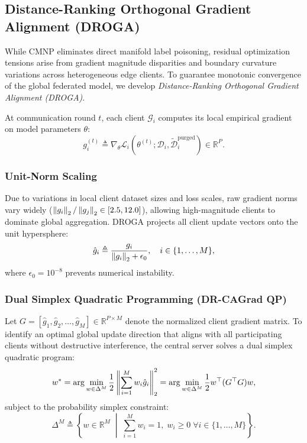 \subsection{Distance-Ranking Orthogonal Gradient Alignment (DROGA)}
\label{subsec:droga}

While CMNP eliminates direct manifold label poisoning, residual optimization tensions arise from gradient magnitude disparities and boundary curvature variations across heterogeneous edge clients. To guarantee monotonic convergence of the global federated model, we develop \emph{Distance-Ranking Orthogonal Gradient Alignment (DROGA)}.

At communication round $t$, each client $\mathcal{G}_i$ computes its local empirical gradient on model parameters $\theta$:
\begin{equation}
g_i^{(t)} \triangleq \nabla_\theta \mathcal{L}_i(\theta^{(t)}; \mathcal{D}_i, \tilde{\mathcal{D}}_i^{\text{purged}}) \in \mathbb{R}^P.
\end{equation}

\subsubsection{Unit-Norm Scaling}
Due to variations in local client dataset sizes and loss scales, raw gradient norms vary widely ($\left\lVert g_i\right\rVert_2 / \left\lVert g_j\right\rVert_2 \in [2.5, 12.0]$), allowing high-magnitude clients to dominate global aggregation. DROGA projects all client update vectors onto the unit hypersphere:
\begin{equation}
\label{eq:unit_norm}
\hat{g}_i \triangleq \frac{g_i}{\left\lVert g_i\right\rVert_2 + \epsilon_0}, \quad i \in \{1, \dots, M\},
\end{equation}
where $\epsilon_0 = 10^{-8}$ prevents numerical instability.

\subsubsection{Dual Simplex Quadratic Programming (DR-CAGrad QP)}
Let $G = [\hat{g}_1, \hat{g}_2, \dots, \hat{g}_M] \in \mathbb{R}^{P \times M}$ denote the normalized client gradient matrix. To identify an optimal global update direction that aligns with all participating clients without destructive interference, the central server solves a dual simplex quadratic program:
\begin{equation}
\label{eq:droga_qp}
w^* = \arg\min_{w \in \Delta^M} \frac{1}{2} \left\lVert\sum_{i=1}^M w_i \hat{g}_i\right\rVert_2^2 = \arg\min_{w \in \Delta^M} \frac{1}{2} w^\top (G^\top G) w,
\end{equation}
subject to the probability simplex constraint:
\begin{equation}
\Delta^M \triangleq \left\{ w \in \mathbb{R}^M \;\middle|\; \sum_{i=1}^M w_i = 1, \; w_i \ge 0 \; \forall i \in \{1, \dots, M\} \right\}.
\end{equation}

